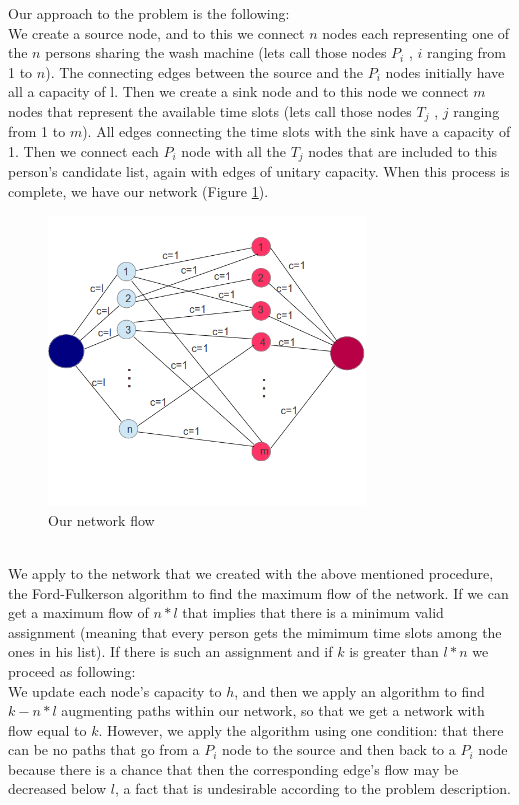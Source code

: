 Our approach to the problem is the following:\\
We create a source node, and to this we connect $n$ nodes each representing one of the $n$ persons sharing the wash machine (lets call those nodes $P_i$ , $i$ ranging from 1 to $n$). The connecting edges between the source and the $P_i$ nodes initially have all a capacity of l. Then we create a sink node and to this node we connect $m$ nodes that represent the available time slots (lets call those nodes $T_j$ , $j$ ranging from 1 to $m$). All edges connecting the time slots with the sink have a capacity of 1. Then we connect each $P_i$ node with all the $T_j$ nodes that are included to this person's candidate list, again with edges of unitary capacity. When this process is complete, we have our network (Figure \ref{fig:prob3}).\\
\begin{figure}[ht]
\centering
\includegraphics[width=0.75\textwidth]{prob3}%
\caption{Our network flow}%
\label{fig:prob3}%
\end{figure}
\\
We apply to the network that we created with the above mentioned procedure, the Ford-Fulkerson algorithm to find the maximum flow of the network. If we can get a maximum flow of $n*l$ that implies that there is a minimum valid assignment (meaning that every person gets the mimimum time slots among the ones in his list). If there is such an assignment and if $k$ is greater than $l*n$ we proceed as following:\\
We update each node's capacity to $h$, and then we apply an algorithm to find ${k-n*l}$ augmenting paths within our network, so that we get a network with flow equal to $k$. However, we apply the algorithm using one condition: that there can be no paths that go from a $P_i$ node to the source and then back to a $P_i$ node because there is a chance that then the corresponding edge's flow may be decreased below $l$, a fact that is undesirable according to the problem description.\\
